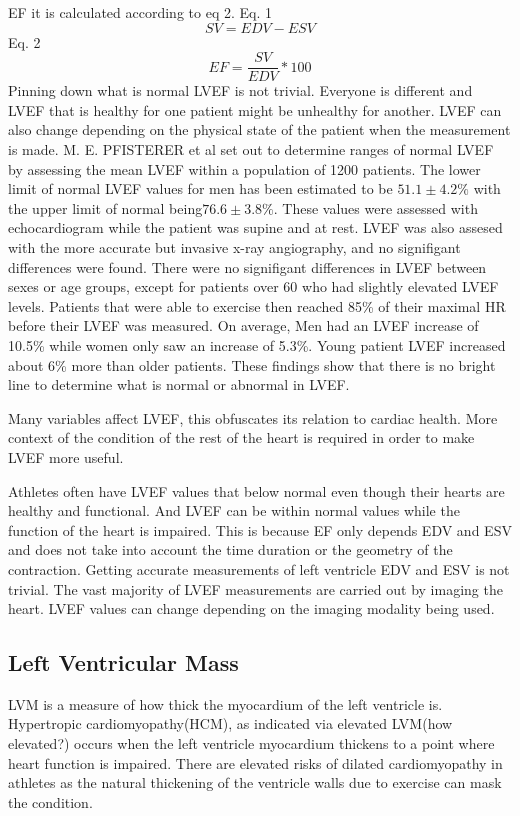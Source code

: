 \documentclass{article}
\begin{document}
EF it is calculated according to eq 2.
Eq. 1
\[SV = EDV - ESV\]
Eq. 2
\[EF = \frac{SV}{EDV} * 100   \]  
Pinning down what is normal LVEF is not trivial.
Everyone is different and LVEF that is healthy for one patient might be unhealthy for another.
LVEF can also change depending on the physical state of the patient when the measurement is made.
M. E. PFISTERER et al set out to determine ranges of normal LVEF by assessing the mean LVEF within a population of 1200 patients.
The lower limit of normal LVEF values for men has been estimated to be $ 51.1 \pm 4.2\%$ with the upper limit of normal being$ 76.6 \pm 3.8\%$.
These values were assessed with echocardiogram while the patient was supine and at rest.
LVEF was also assesed with the more accurate but invasive x-ray angiography, and no signifigant differences were found.
There were no signifigant differences in LVEF between sexes or age groups, except for patients over 60 who had slightly elevated LVEF levels.
Patients that were able to exercise then reached 85\% of their maximal HR before their LVEF was measured.
On average, Men had an LVEF increase of 10.5\% while women only saw an increase of 5.3\%.
Young patient LVEF increased about 6\% more than older patients\cite{norm_EF_values}.
These findings show that there is no bright line to determine what is normal or abnormal in LVEF.


Many variables affect LVEF, this obfuscates its relation to cardiac health. 
More context of the condition of the rest of the heart is required in order to make LVEF more useful.

Athletes often have LVEF values that below normal even though their hearts are healthy and functional\cite{ef_soa}.
And LVEF can be within normal values while the function of the heart is impaired.
This is because EF only depends EDV and ESV and does not take into account the time duration or the geometry of the contraction.
Getting accurate measurements of left ventricle EDV and ESV is not trivial.
The vast majority of LVEF measurements are carried out by imaging the heart\cite{ef_soa}.
 \cite{understanding-echo}
LVEF values can change depending on the imaging modality being used.

\subsection{Left Ventricular Mass}
LVM is a measure of how thick the myocardium of the left ventricle is.
Hypertropic cardiomyopathy(HCM), as indicated via elevated LVM(how elevated?) occurs when the left ventricle myocardium thickens to a point where heart function is impaired.
There are elevated risks of dilated cardiomyopathy in athletes as the natural thickening of the ventricle walls due to exercise can mask the condition.
\end{document}
